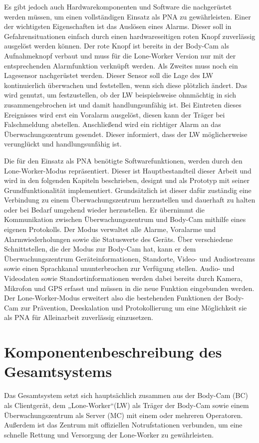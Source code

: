 \documentclass[thesis.tex]{subfiles}
\begin{document}
Es gibt jedoch auch Hardwarekomponenten und Software die nachgerüstet werden müssen, um einen vollständigen Einsatz als PNA zu gewährleisten.
Einer der wichtigsten Eigenschaften ist das Auslösen eines Alarms.
Dieser soll in Gefahrensituationen einfach durch einen hardwareseitigen roten Knopf zuverlässig ausgelöst werden können.
Der rote Knopf ist bereits in der Body-Cam als Aufnahmeknopf verbaut und muss für die Lone-Worker Version nur mit der entsprechenden Alarmfunktion verknüpft werden.
Als Zweites muss noch ein Lagesensor nachgerüstet werden.
Dieser Sensor soll die Lage des LW kontinuierlich überwachen und feststellen, wenn sich diese plötzlich ändert.
Das wird genutzt, um festzustellen, ob der LW beispielsweise ohnmächtig in sich zusammengebrochen ist und damit handlungsunfähig ist.
Bei Eintreten dieses Ereignisses wird erst ein Voralarm ausgelöst, diesen kann der Träger bei Falschmeldung abstellen.
Anschließend wird ein richtiger Alarm an das Überwachungszentrum gesendet.
Dieser informiert, dass der LW möglicherweise verunglückt und handlungsunfähig ist.

Die für den Einsatz als PNA benötigte Softwarefunktionen, werden durch den Lone-Worker-Modus repräsentiert.
Dieser ist Hauptbestandteil dieser Arbeit und wird in den folgenden Kapiteln beschrieben, designt und als Prototyp mit seiner Grundfunktionalität implementiert.
Grundsätzlich ist dieser dafür zuständig eine Verbindung zu einem Überwachungszentrum herzustellen und dauerhaft zu halten oder bei Bedarf umgehend wieder herzustellen.
Er übernimmt die Kommunikation zwischen Überwachungszentrum und Body-Cam mithilfe eines eigenen Protokolls.
Der Modus verwaltet alle Alarme, Voralarme und Alarmwiederholungen sowie die Statuswerte des Geräts.
Über verschiedene Schnittstellen, die der Modus zur Body-Cam hat, kann er dem Überwachungszentrum Geräteinformationen, Standorte, Video- und Audiostreams sowie einen Sprachkanal ununterbrochen zur Verfügung stellen.
Audio- und Videodaten sowie Standortinformationen werden dabei bereits durch Kamera, Mikrofon und GPS erfasst und müssen in die neue Funktion eingebunden werden.
Der Lone-Worker-Modus erweitert also die bestehenden Funktionen der Body-Cam zur Prävention, Deeskalation und Protokollierung um eine Möglichkeit sie als PNA für Alleinarbeit zuverlässig einzusetzen.

\section{Komponentenbeschreibung des Gesamtsystems}
Das Gesamtsystem setzt sich hauptsächlich zusammen aus der Body-Cam (BC) als Clientgerät, dem „Lone-Worker“(LW)
als Träger der Body-Cam sowie einem Überwachungszentrum als Server (MC) mit einem oder mehreren Operatoren.
Außerdem ist das Zentrum mit offiziellen Notrufstationen verbunden, um eine schnelle Rettung und Versorgung der Lone-Worker zu gewährleisten.
\end{document}
